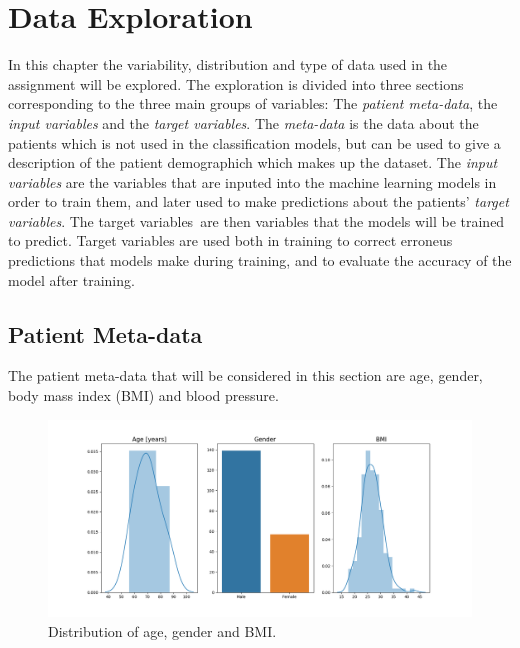 \chapter{Data Exploration} \label{chap:data}

In this chapter the variability, distribution and type of data used in the assignment will be explored. The exploration is divided into three sections corresponding to the three main groups of variables: The \textit{patient meta-data}, the \textit{input variables} and the \textit{target variables}. The \textit{meta-data} is the data about the patients which is not used in the classification models, but can be used to give a description of the patient demographich which makes up the dataset. The \textit{input variables} are the variables that are inputed into the machine learning models in order to train them, and later used to make predictions about the patients' \textit{target variables}. The target variables are then variables that the models will be trained to predict. Target variables are used both in training to correct erroneus predictions that models make during training, and to evaluate the accuracy of the model after training.   

\section{Patient Meta-data} \label{sec:metadata}
The patient meta-data that will be considered in this section are age, gender, body mass index (BMI) and blood pressure.

\begin{figure}
    \begin{center}
    \includegraphics[width=\textwidth]{data-exp/metadataDist4.png}
    \end{center}
    \caption{Distribution of age, gender and BMI.}
    \label{fig:meta-dist4}
\end{figure}

